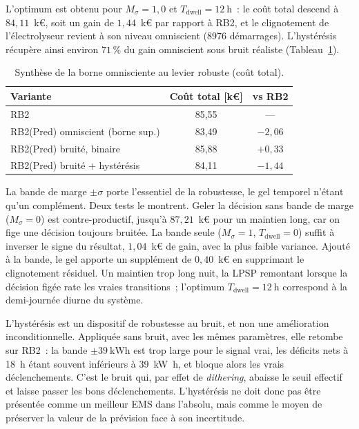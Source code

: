 L'optimum est obtenu pour $M_\sigma=1{,}0$ et $T_{\text{dwell}}=\SI{12}{\hour}$~: le coût total descend à $84{,}11$~k€, soit un gain de $1{,}44$~k€ par rapport à RB2, et le clignotement de l'électrolyseur revient à son niveau omniscient (\num{8976} démarrages). L'hystérésis récupère ainsi environ $71\,\%$ du gain omniscient sous bruit réaliste (Tableau~\ref{tab:robust_summary}).

\begin{table}[h!]
\centering
\caption{Synthèse de la borne omnisciente au levier robuste (coût total).}
\label{tab:robust_summary}
\begin{tabular}{lcc}
\hline
Variante & Coût total [k€] & vs RB2 \\
\hline
RB2                                 & 85,55 & --- \\
RB2(Pred) omniscient (borne sup.)   & 83,49 & $-2{,}06$ \\
RB2(Pred) bruité, binaire           & 85,88 & $+0{,}33$ \\
RB2(Pred) bruité + hystérésis       & 84,11 & $-1{,}44$ \\
\hline
\end{tabular}
\end{table}

La bande de marge $\pm\sigma$ porte l'essentiel de la robustesse, le gel temporel n'étant qu'un complément. Deux tests le montrent. Geler la décision sans bande de marge ($M_\sigma=0$) est contre-productif, jusqu'à $87{,}21$~k€ pour un maintien long, car on fige une décision toujours bruitée. La bande seule ($M_\sigma=1$, $T_{\text{dwell}}=0$) suffit à inverser le signe du résultat, $1{,}04$~k€ de gain, avec la plus faible variance. Ajouté à la bande, le gel apporte un supplément de $0{,}40$~k€ en supprimant le clignotement résiduel. Un maintien trop long nuit, la LPSP remontant lorsque la décision figée rate les vraies transitions~; l'optimum $T_{\text{dwell}}=\SI{12}{\hour}$ correspond à la demi-journée diurne du système.

L'hystérésis est un dispositif de robustesse au bruit, et non une amélioration inconditionnelle. Appliquée sans bruit, avec les mêmes paramètres, elle retombe sur RB2~: la bande $\pm\SI{39}{\kilo\watt\hour}$ est trop large pour le signal vrai, les déficits nets à \SI{18}{\hour} étant souvent inférieurs à \SI{39}{\kilo\watt\hour}, et bloque alors les vrais déclenchements. C'est le bruit qui, par effet de \textit{dithering}, abaisse le seuil effectif et laisse passer les bons déclenchements. L'hystérésis ne doit donc pas être présentée comme un meilleur EMS dans l'absolu, mais comme le moyen de préserver la valeur de la prévision face à son incertitude.

